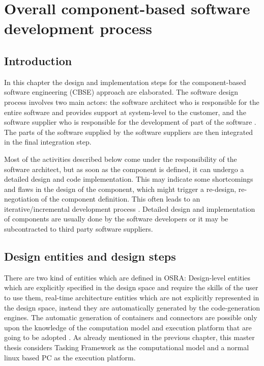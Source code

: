 
\chapter{Overall component-based software development process}
\label{chap: Software development process}
\section{Introduction}
In this chapter the design and implementation steps for the component-based software engineering (CBSE) approach are elaborated. The software design process involves two main actors: the software architect who is responsible for the entire software and provides support at system-level to the customer, and the software supplier who is responsible for the development of part of the software \cite{CompBasedProcess}. The parts of the software supplied by the software suppliers are then integrated in the final integration step.

Most of the activities described below come under the responsibility of the software architect, but as soon as the component is defined, it can undergo a detailed design and code implementation. This may indicate some shortcomings and flaws in the design of the component, which might trigger a re-design, re-negotiation of the component definition. This often leads to an iterative/incremental development process \cite{ScheduAnaly}. Detailed design and implementation of components are usually done by the software developers or it may be subcontracted to third party software suppliers. 

\section{Design entities and design steps}
\label{section: Design steps}
There are two kind of entities which are defined in OSRA: Design-level entities which are explicitly specified in the design space and require the skills of the user to use them, real-time architecture entities which are not explicitly represented in the design space, instead they are automatically generated by the code-generation engines. The automatic generation of containers and connectors are possible only upon the knowledge of the computation model and execution platform that are going to be adopted \cite{SAVOIR}\cite{CompBasedProcess}. As already mentioned in the previous chapter, this master thesis considers Tasking Framework as the computational model and a normal linux based PC as the execution platform.   

